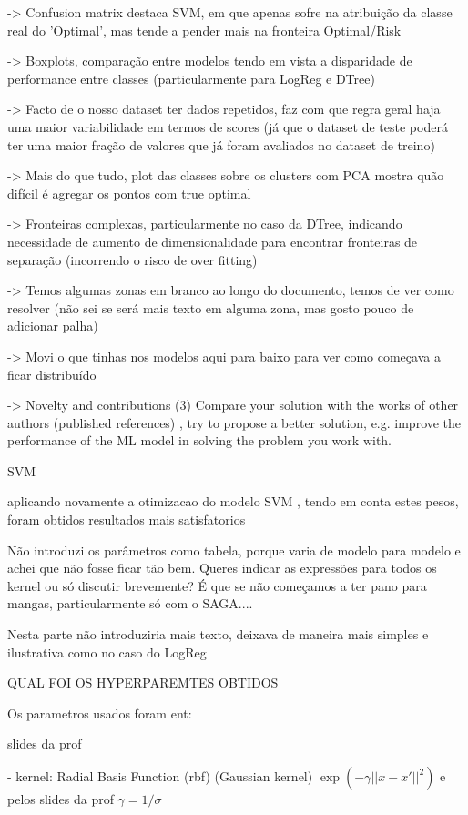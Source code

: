 \documentclass[conference]{IEEEtran}
\begin{document}
-> Confusion matrix destaca SVM, em que apenas sofre na atribuição da classe real do 'Optimal', mas tende a pender mais na fronteira Optimal/Risk

-> Boxplots, comparação entre modelos tendo em vista a disparidade de performance entre classes (particularmente para LogReg e DTree)

-> Facto de o nosso dataset ter dados repetidos, faz com que regra geral haja uma maior variabilidade em termos de scores (já que o dataset de teste poderá ter uma maior fração de valores que já foram avaliados no dataset de treino)

-> Mais do que tudo, plot das classes sobre os clusters com PCA mostra quão difícil é agregar os pontos com true optimal

-> Fronteiras complexas, particularmente no caso da DTree, indicando necessidade de aumento de dimensionalidade para encontrar fronteiras de separação (incorrendo o risco de over fitting)

-> Temos algumas zonas em branco ao longo do documento, temos de ver como resolver (não sei se será mais texto em alguma zona, mas gosto pouco de adicionar palha)

-> Movi o que tinhas nos modelos aqui para baixo para ver como começava a ficar distribuído

-> Novelty and contributions (3) Compare your solution with the works of other authors (published references) , try to propose a better solution, e.g. improve the performance of the ML model in solving the problem you work with.

SVM

aplicando novamente a otimizacao do modelo SVM , tendo em conta estes pesos, foram obtidos resultados mais satisfatorios

Não introduzi os parâmetros como tabela, porque varia de modelo para modelo e achei que não fosse ficar tão bem. Queres indicar as expressões para todos os kernel ou só discutir brevemente? É que se não começamos a ter pano para mangas, particularmente só com o SAGA....

Nesta parte não introduziria mais texto, deixava de maneira mais simples e ilustrativa como no caso do LogReg


QUAL FOI OS HYPERPAREMTES OBTIDOS

Os parametros usados foram ent:

slides da prof

- kernel: Radial Basis Function (rbf) (Gaussian kernel) $\exp(-\gamma ||x - x'||^2)$ e pelos slides da prof $\gamma = 1 / \sigma$ 
\end{document}
